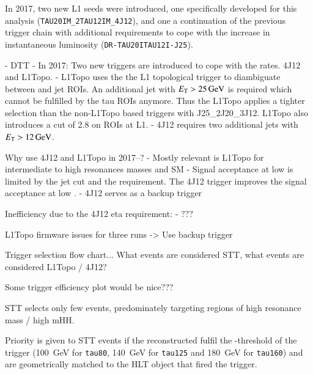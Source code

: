 In 2017, two new L1 seeds were introduced, one specifically developed
for this analysis (\texttt{TAU20IM\_2TAU12IM\_4J12}), and one a
continuation of the previous trigger chain with additional
requirements to cope with the increase in instantaneous luminosity
(\texttt{DR-TAU20ITAU12I-J25}). \LOneTopo \FourJTwelve

- DTT
  - In 2017: Two new triggers are introduced to cope with the rates. 4J12 and L1Topo.
    - L1Topo uses the the L1 topological trigger to diambiguate between \tauhadvis and jet ROIs. An additional jet with $E_{\text{T}} > \SI{25}{\ensuremath{\text{GeV}}}$ is required which cannot be fulfilled by the tau ROIs anymore. Thus the L1Topo applies a tighter selection than the non-L1Topo based triggers with J25\_2J20\_3J12. L1Topo also introduces a \dRtautau cut of 2.8 on \tauhadvis ROIs at L1.
    - 4J12 requires two additional jets with $\ET > \SI{12}{\GeV}$.

 Why use 4J12 and L1Topo in 2017--?
 - Mostly relevant is L1Topo for intermediate to high resonances masses and SM \HH
 - Signal acceptance at low \mHH is limited by the jet \pT cut and the \dRtautau requirement. The 4J12 trigger improves the signal acceptance at low \mHH.
 - 4J12 serves as a backup trigger

 Inefficiency due to the 4J12 eta requirement:
 - ???

 L1Topo firmware issues for three runs
 -> Use backup trigger


Trigger selection flow chart...
What events are considered STT, what events are considered L1Topo / 4J12?

Some trigger efficiency plot would be nice???

STT selects only few events, predominately targeting regions of high resonance mass / high mHH.









Priority is given to STT events if the reconstructed \tauhad fulfil the
\pT-threshold of the trigger (\SI{100}{\GeV} for \verb|tau80|, \SI{140}{\GeV}
for \verb|tau125| and \SI{180}{\GeV} for \verb|tau160|) and are geometrically
matched to the HLT object that fired the trigger.

